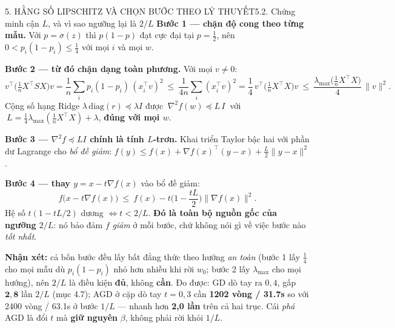 \documentclass[aspectratio=169,11pt]{beamer}
\newcommand{\nx}{\textbf{Nhận xét:}}
\newcommand{\norm}[1]{\lVert #1 \rVert}
\begin{document}
\begin{frame}{5. HẰNG SỐ LIPSCHITZ VÀ CHỌN BƯỚC THEO LÝ THUYẾT}{5.2. Chứng minh cận $L$, và vì sao ngưỡng lại là $2/L$}
  \footnotesize
  \textbf{Bước 1 --- chặn độ cong theo từng mẫu.} Với $p=\sigma(z)$ thì $p(1-p)$ đạt cực đại tại
  $p=\frac12$, nên $0<p_i(1-p_i)\le\frac14$ với mọi $i$ và mọi $w$.

  \textbf{Bước 2 --- từ đó chặn dạng toàn phương.} Với mọi $v\ne0$:
  \[
    v^\top\!\Big(\tfrac1n X^\top S X\Big)v=\frac1n\sum_i p_i(1-p_i)\,(x_i^\top v)^2
    \ \le\ \frac{1}{4n}\sum_i (x_i^\top v)^2=\frac14\,v^\top\!\Big(\tfrac1n X^\top X\Big)v
    \ \le\ \frac{\lambda_{\max}\!\big(\tfrac1n X^\top X\big)}{4}\,\norm{v}^2 .
  \]
  Cộng số hạng Ridge $\lambda\,\mathrm{diag}(r)\preceq\lambda I$ được
  $\ \nabla^2f(w)\preceq L\,I\ $ với $\ L=\frac14\lambda_{\max}(\frac1nX^\top X)+\lambda$,
  \textbf{đúng với mọi $w$}.

  \textbf{Bước 3 --- $\nabla^2f\preceq LI$ chính là tính $L$-trơn.} Khai triển Taylor bậc hai với phần
  dư Lagrange cho \emph{bổ đề giảm}: $f(y)\le f(x)+\nabla f(x)^\top(y-x)+\frac{L}{2}\norm{y-x}^2$.

  \textbf{Bước 4 --- thay $y=x-t\nabla f(x)$} vào bổ đề giảm:
  \[
    f\big(x-t\nabla f(x)\big)\ \le\ f(x)-t\Big(1-\frac{tL}{2}\Big)\norm{\nabla f(x)}^2 .
  \]
  Hệ số $t(1-tL/2)$ dương $\iff t<2/L$. \textbf{Đó là toàn bộ nguồn gốc của ngưỡng $2/L$}: nó bảo
  đảm $f$ \emph{giảm} ở mỗi bước, chứ không nói gì về việc bước nào \emph{tốt nhất}.
  \vspace{2pt}

  {\scriptsize\nx{} cả bốn bước đều lấy bất đẳng thức theo hướng \emph{an toàn} (bước 1 lấy
  $\frac14$ cho mọi mẫu dù $p_i(1-p_i)$ nhỏ hơn nhiều khi rời $w_0$; bước 2 lấy $\lambda_{\max}$
  cho mọi hướng), nên $2/L$ là điều kiện \textbf{đủ}, không \textbf{cần}. Đo được: GD dò tay ra
  $0{,}4$, gấp $\mathbf{2{,}8}$ lần $2/L$ (mục 4.7); AGD ở cặp dò tay $t=0{,}3$ cần
  \textbf{\num{1202} vòng / \num{31.7}s} so với \num{2400} vòng / \num{63.1}s ở bước $1/L$ ---
  nhanh hơn \textbf{2,0 lần} trên cả hai trục. Cái \emph{phá} AGD là đổi $t$ mà \textbf{giữ nguyên} $\beta$, không
  phải rời khỏi $1/L$.}
\end{frame}
\end{document}
